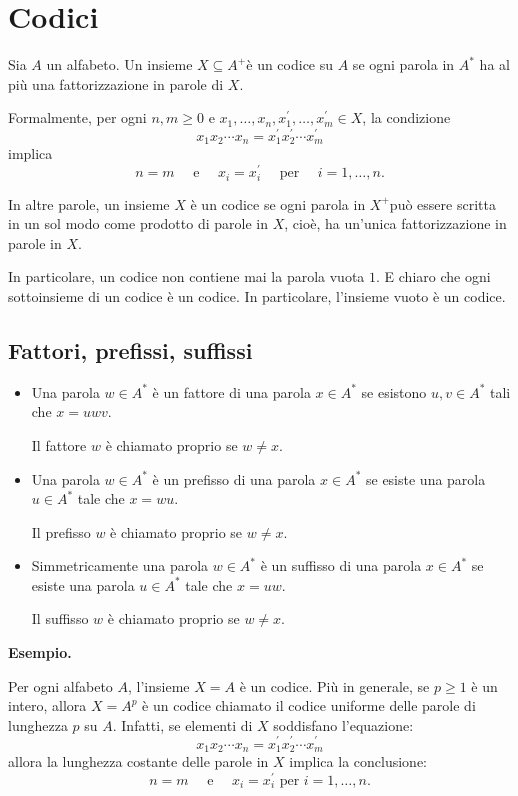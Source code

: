 \chapter{Codici}

Sia $A$ un alfabeto. Un insieme $X \subseteq A^{+}$è un codice su $A$ se ogni parola in $A^{*}$ ha al più una fattorizzazione in parole di $X$.

Formalmente, per ogni $n, m \geq 0$ e $x_{1}, \ldots, x_{n}, x_{1}^{\prime}, \ldots, x_{m}^{\prime} \in X$, la condizione
$$
x_{1} x_{2} \cdots x_{n}=x_{1}^{\prime} x_{2}^{\prime} \cdots x_{m}^{\prime}
$$
implica
$$
n=m \quad \text { e } \quad x_{i}=x_{i}^{\prime} \quad \text { per } \quad i=1, \ldots, n .
$$

\vspace{5mm}

In altre parole, un insieme $X$ è un codice se ogni parola in $X^{+}$può essere scritta in un sol modo come prodotto di parole in $X$, cioè, ha un'unica fattorizzazione in parole in $X$.

In particolare, un codice non contiene mai la parola vuota $1 .$
E chiaro che ogni sottoinsieme di un codice è un codice. In particolare, l'insieme vuoto è un codice.

\section{Fattori, prefissi, suffissi}

\begin{itemize}
    \item Una parola $w \in A^{*}$ è un fattore di una parola $x \in A^{*}$ se esistono $u, v \in A^{*}$ tali che $x=u w v$.
    
Il fattore $w$ è chiamato proprio se $w \neq x$.
    \item Una parola $w \in A^{*}$ è un prefisso di una parola $x \in A^{*}$ se esiste una parola $u \in A^{*}$ tale che $x=w u$.
    
Il prefisso $w$ è chiamato proprio se $w \neq x$.
    \item Simmetricamente una parola $w \in A^{*}$ è un suffisso di una parola $x \in A^{*}$ se esiste una parola $u \in A^{*}$ tale che $x=u w$. 
    
    Il suffisso $w$ è chiamato proprio se $w \neq x$.
\end{itemize}

\textbf{Esempio.}

Per ogni alfabeto $A$, l'insieme $X=A$ è un codice.
Più in generale, se $p \geq 1$ è un intero, allora $X=A^{p}$ è un codice chiamato il codice uniforme delle parole di lunghezza $p$ su $A$. Infatti, se elementi di $X$ soddisfano l'equazione:
$$
x_{1} x_{2} \cdots x_{n}=x_{1}^{\prime} x_{2}^{\prime} \cdots x_{m}^{\prime}
$$
allora la lunghezza costante delle parole in $X$ implica la conclusione:
$$
n=m \quad \text { e } \quad x_{i}=x_{i}^{\prime} \text { per } i=1, \ldots, n .
$$

